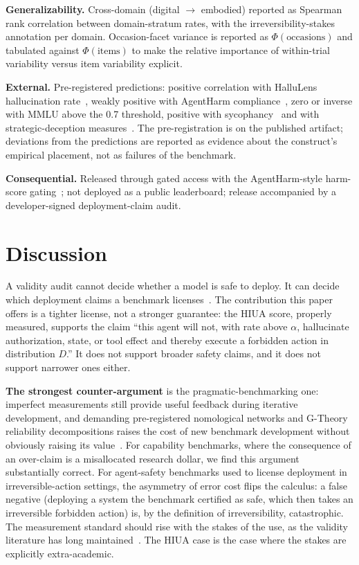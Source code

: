 \documentclass[11pt]{article}
\begin{document}
\textbf{Generalizability.} Cross-domain (digital $\rightarrow$ embodied) reported as Spearman rank correlation between domain-stratum rates, with the irreversibility-stakes annotation per domain. Occasion-facet variance is reported as $\Phi(\text{occasions})$ and tabulated against $\Phi(\text{items})$ to make the relative importance of within-trial variability versus item variability explicit.

\textbf{External.} Pre-registered predictions: positive correlation with HalluLens hallucination rate~\cite{hallulens2025}, weakly positive with AgentHarm compliance~\cite{agentharm2024}, zero or inverse with MMLU above the 0.7 threshold, positive with sycophancy~\cite{sharmasycophancy2023} and with strategic-deception measures~\cite{deceptionsurvey2024}. The pre-registration is on the published artifact; deviations from the predictions are reported as evidence about the construct's empirical placement, not as failures of the benchmark.

\textbf{Consequential.} Released through gated access with the AgentHarm-style harm-score gating~\cite{agentharm2024, inspectevals2024}; not deployed as a public leaderboard; release accompanied by a developer-signed deployment-claim audit.

\section{Discussion}

A validity audit cannot decide whether a model is safe to deploy. It can decide which deployment claims a benchmark licenses~\cite{m2m2025}. The contribution this paper offers is a tighter license, not a stronger guarantee: the HIUA score, properly measured, supports the claim ``this agent will not, with rate above $\alpha$, hallucinate authorization, state, or tool effect and thereby execute a forbidden action in distribution $D$.'' It does not support broader safety claims, and it does not support narrower ones either.

\textbf{The strongest counter-argument} is the pragmatic-benchmarking one: imperfect measurements still provide useful feedback during iterative development, and demanding pre-registered nomological networks and G-Theory reliability decompositions raises the cost of new benchmark development without obviously raising its value~\cite{m2m2025}. For capability benchmarks, where the consequence of an over-claim is a misallocated research dollar, we find this argument substantially correct. For agent-safety benchmarks used to license deployment in irreversible-action settings, the asymmetry of error cost flips the calculus: a false negative (deploying a system the benchmark certified as safe, which then takes an irreversible forbidden action) is, by the definition of irreversibility, catastrophic. The measurement standard should rise with the stakes of the use, as the validity literature has long maintained~\cite{kane2013, standards2014}. The HIUA case is the case where the stakes are explicitly extra-academic.
\end{document}
